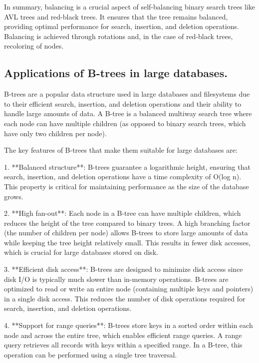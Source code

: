 \documentclass{article}
\begin{document}
In summary, balancing is a crucial aspect of self-balancing binary search trees like AVL trees and red-black trees. It ensures that the tree remains balanced, providing optimal performance for search, insertion, and deletion operations. Balancing is achieved through rotations and, in the case of red-black trees, recoloring of nodes.


\subsection{Applications of B-trees in large databases.}

B-trees are a popular data structure used in large databases and filesystems due to their efficient search, insertion, and deletion operations and their ability to handle large amounts of data. A B-tree is a balanced multiway search tree where each node can have multiple children (as opposed to binary search trees, which have only two children per node).

The key features of B-trees that make them suitable for large databases are:

1. **Balanced structure**: B-trees guarantee a logarithmic height, ensuring that search, insertion, and deletion operations have a time complexity of O(log n). This property is critical for maintaining performance as the size of the database grows.

2. **High fan-out**: Each node in a B-tree can have multiple children, which reduces the height of the tree compared to binary trees. A high branching factor (the number of children per node) allows B-trees to store large amounts of data while keeping the tree height relatively small. This results in fewer disk accesses, which is crucial for large databases stored on disk.

3. **Efficient disk access**: B-trees are designed to minimize disk access since disk I/O is typically much slower than in-memory operations. B-trees are optimized to read or write an entire node (containing multiple keys and pointers) in a single disk access. This reduces the number of disk operations required for search, insertion, and deletion operations.

4. **Support for range queries**: B-trees store keys in a sorted order within each node and across the entire tree, which enables efficient range queries. A range query retrieves all records with keys within a specified range. In a B-tree, this operation can be performed using a single tree traversal.
\end{document}
